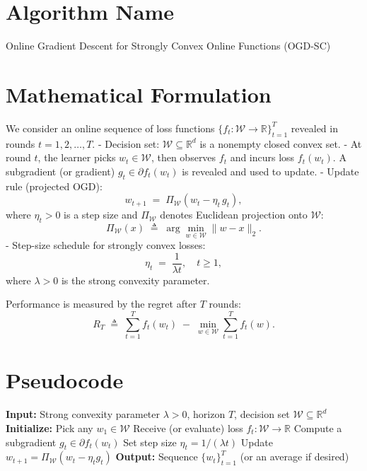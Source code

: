 \documentclass[12pt]{article}
\begin{document}
\section*{Algorithm Name}
Online Gradient Descent for Strongly Convex Online Functions (OGD-SC)

\section*{Mathematical Formulation}
We consider an online sequence of loss functions $\{f_t:\mathcal{W}\to\mathbb{R}\}_{t=1}^T$ revealed in rounds $t=1,2,\dots,T$.
- Decision set: $\mathcal{W}\subseteq \mathbb{R}^d$ is a nonempty closed convex set.
- At round $t$, the learner picks $w_t\in \mathcal{W}$, then observes $f_t$ and incurs loss $f_t(w_t)$. A subgradient (or gradient) $g_t\in \partial f_t(w_t)$ is revealed and used to update.
- Update rule (projected OGD):
\[
w_{t+1} \;=\; \Pi_{\mathcal{W}}\!\left(w_t - \eta_t \, g_t\right),
\]
where $\eta_t>0$ is a step size and $\Pi_{\mathcal{W}}$ denotes Euclidean projection onto $\mathcal{W}$:
\[
\Pi_{\mathcal{W}}(x) \;\triangleq\; \arg\min_{w\in \mathcal{W}} \|w-x\|_2.
\]
- Step-size schedule for strongly convex losses:
\[
\eta_t \;=\; \frac{1}{\lambda t}, \quad t\ge 1,
\]
where $\lambda>0$ is the strong convexity parameter.

Performance is measured by the regret after $T$ rounds:
\[
R_T \;\triangleq\; \sum_{t=1}^T f_t(w_t) \;-\; \min_{w\in \mathcal{W}} \sum_{t=1}^T f_t(w).
\]

\section*{Pseudocode}
\begin{algorithm}[H]
\caption{OGD-SC: Online Gradient Descent for Strongly Convex Losses}
\begin{algorithmic}[1]
\STATE \textbf{Input:} Strong convexity parameter $\lambda>0$, horizon $T$, decision set $\mathcal{W}\subseteq\mathbb{R}^d$
\STATE \textbf{Initialize:} Pick any $w_1\in \mathcal{W}$
    \STATE Receive (or evaluate) loss $f_t:\mathcal{W}\to\mathbb{R}$
    \STATE Compute a subgradient $g_t\in \partial f_t(w_t)$
    \STATE Set step size $\eta_t = 1/(\lambda t)$
    \STATE Update $w_{t+1} = \Pi_{\mathcal{W}}\!\left(w_t - \eta_t g_t\right)$
\ENDFOR
\STATE \textbf{Output:} Sequence $\{w_t\}_{t=1}^T$ (or an average if desired)
\end{algorithmic}
\end{algorithm}
\end{document}
